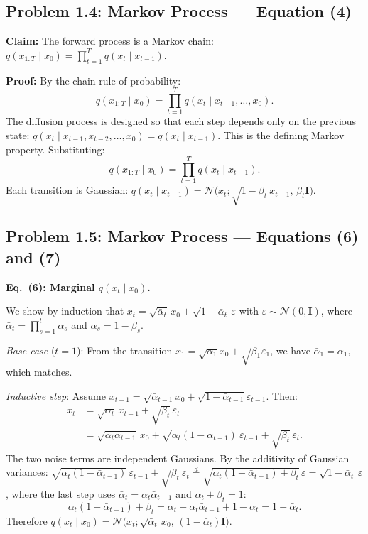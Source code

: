 \documentclass[11pt]{article}
\newcommand{\N}{\mathcal{N}}
\newcommand{\abar}{\bar{\alpha}}
\begin{document}
\subsection{Problem 1.4: Markov Process — Equation (4)}

\textbf{Claim:} The forward process is a Markov chain:
$q(x_{1:T}\mid x_0) = \prod_{t=1}^{T}q(x_t\mid x_{t-1})$.

\textbf{Proof:} By the chain rule of probability:
\begin{equation}
q(x_{1:T}\mid x_0)
= \prod_{t=1}^{T} q(x_t\mid x_{t-1},\ldots,x_0).
\end{equation}
The diffusion process is designed so that each step depends only on the previous
state: $q(x_t\mid x_{t-1},x_{t-2},\ldots,x_0) = q(x_t\mid x_{t-1})$.
This is the defining Markov property. Substituting:
\begin{equation}
q(x_{1:T}\mid x_0) = \prod_{t=1}^{T}q(x_t\mid x_{t-1}).
\end{equation}
Each transition is Gaussian:
$q(x_t\mid x_{t-1}) = \N\!\bigl(x_t;\sqrt{1-\beta_t}\,x_{t-1},\,\beta_t\mathbf{I}\bigr)$.

\subsection{Problem 1.5: Markov Process — Equations (6) and (7)}

\textbf{Eq.~(6): Marginal $q(x_t\mid x_0)$.}

We show by induction that $x_t = \sqrt{\abar_t}\,x_0 + \sqrt{1-\abar_t}\,\varepsilon$
with $\varepsilon\sim\N(0,\mathbf{I})$, where $\abar_t=\prod_{s=1}^{t}\alpha_s$ and $\alpha_s=1-\beta_s$.

\textit{Base case} ($t=1$): From the transition $x_1 = \sqrt{\alpha_1}x_0 + \sqrt{\beta_1}\varepsilon_1$, we have $\abar_1=\alpha_1$, which matches.

\textit{Inductive step}: Assume $x_{t-1} = \sqrt{\abar_{t-1}}x_0 + \sqrt{1-\abar_{t-1}}\varepsilon_{t-1}$.
Then:
\begin{align*}
x_t &= \sqrt{\alpha_t}\,x_{t-1} + \sqrt{\beta_t}\,\varepsilon_t\\
    &= \sqrt{\alpha_t\abar_{t-1}}\,x_0
       + \sqrt{\alpha_t(1-\abar_{t-1})}\,\varepsilon_{t-1}
       + \sqrt{\beta_t}\,\varepsilon_t.
\end{align*}
The two noise terms are independent Gaussians. By the additivity of Gaussian variances:
$\sqrt{\alpha_t(1-\abar_{t-1})}\,\varepsilon_{t-1} + \sqrt{\beta_t}\,\varepsilon_t
\stackrel{d}{=} \sqrt{\alpha_t(1-\abar_{t-1})+\beta_t}\,\varepsilon
= \sqrt{1-\abar_t}\,\varepsilon$,
where the last step uses $\abar_t = \alpha_t\abar_{t-1}$ and $\alpha_t+\beta_t=1$:
\[
\alpha_t(1-\abar_{t-1})+\beta_t
= \alpha_t - \alpha_t\abar_{t-1} + 1-\alpha_t
= 1-\abar_t.
\]
Therefore $q(x_t\mid x_0)=\N\!\bigl(x_t;\sqrt{\abar_t}\,x_0,\,(1-\abar_t)\mathbf{I}\bigr)$.
\end{document}
